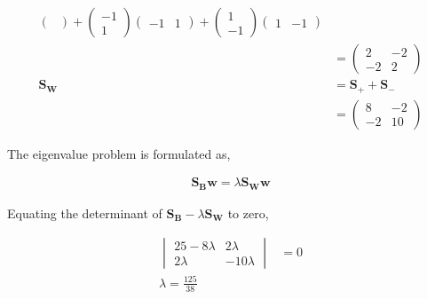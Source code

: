 \documentclass[11pt, a4paper]{article}
\begin{document}
\begin{align*}
\begin{pmatrix}
	\end{pmatrix} + \begin{pmatrix}
	-1 \\
	1
	\end{pmatrix} \begin{pmatrix}
	-1               & 1                                                                                          
	\end{pmatrix} + \begin{pmatrix}
	1 \\
	-1
	\end{pmatrix} \begin{pmatrix}
	1                & -1                                                                                         
	\end{pmatrix}  \\
	                 & = \begin{pmatrix}                                                                          
	2                & -2                                                                                         \\
	-2               & 2                                                                                          
	\end{pmatrix} \\
	\boldsymbol{S_W} & = \boldsymbol{S_+} + \boldsymbol{S_-}                                                      \\
	                 & = \begin{pmatrix}                                                                          
	8                & -2                                                                                         \\
	-2               & 10                                                                                         
	\end{pmatrix}
\end{align*}

The eigenvalue problem is formulated as,

\begin{align*}
	\boldsymbol{S_B}\boldsymbol{w} = \lambda \boldsymbol{S_W}\boldsymbol{w} 
\end{align*}

Equating the determinant of $\boldsymbol{S_B} - \lambda \boldsymbol{S_W}$ to zero,

\begin{align*}
	\begin{vmatrix}
	25-8\lambda   & 2\lambda   \\
	2\lambda      & -10\lambda 
	\end{vmatrix} & = 0        \\
	\lambda = \frac{125}{38}
\end{align*}
\end{document}
